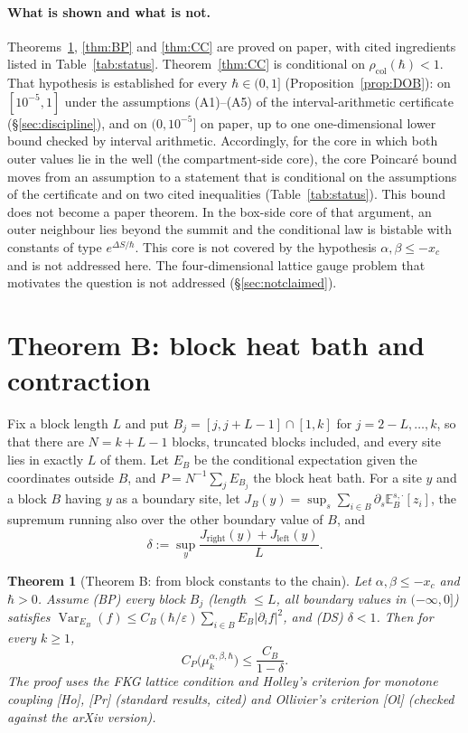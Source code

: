 \documentclass[11pt,a4paper]{article}
\newtheorem{theorem}{Theorem}[section]
\theoremstyle{definition}
\theoremstyle{remark}
\newcommand{\E}{\mathbb{E}}
\newcommand{\Var}{\operatorname{Var}}
\newcommand{\xc}{x_c}
\newcommand{\rcol}{\rho_{\mathrm{col}}}
\begin{document}
\paragraph{What is shown and what is not.} Theorems~\ref{thm:B}, \ref{thm:BP} and \ref{thm:CC} are proved on paper, with cited ingredients listed in Table~\ref{tab:status}. Theorem~\ref{thm:CC} is conditional on $\rcol(\hbar)<1$. That hypothesis is established for every $\hbar\in(0,1]$ (Proposition~\ref{prop:DOB}): on $[10^{-5},1]$ under the assumptions (A1)--(A5) of the interval-arithmetic certificate (\S\ref{sec:discipline}), and on $(0,10^{-5}]$ on paper, up to one one-dimensional lower bound checked by interval arithmetic. Accordingly, for the core in which both outer values lie in the well (the compartment-side core), the core Poincar\'e bound moves from an assumption to a statement that is conditional on the assumptions of the certificate and on two cited inequalities (Table~\ref{tab:status}). This bound does not become a paper theorem. In the box-side core of that argument, an outer neighbour lies beyond the summit and the conditional law is bistable with constants of type $e^{\Delta S/\hbar}$. This core is not covered by the hypothesis $\alpha,\beta\le-\xc$ and is not addressed here. The four-dimensional lattice gauge problem that motivates the question is not addressed (\S\ref{sec:notclaimed}).

\section{Theorem B: block heat bath and contraction}\label{sec:B}

Fix a block length $L$ and put $B_j=[j,j+L-1]\cap[1,k]$ for $j=2-L,\dots,k$, so that there are $N=k+L-1$ blocks, truncated blocks included, and every site lies in exactly $L$ of them. Let $E_B$ be the conditional expectation given the coordinates outside $B$, and $P=N^{-1}\sum_jE_{B_j}$ the block heat bath. For a site $y$ and a block $B$ having $y$ as a boundary site, let $J_B(y)=\sup_s\sum_{i\in B}\partial_s\E_B^{s,\cdot}[z_i]$, the supremum running also over the other boundary value of $B$, and
\[
\delta:=\sup_y\frac{J_{\mathrm{right}}(y)+J_{\mathrm{left}}(y)}{L}.
\]

\begin{theorem}[Theorem B: from block constants to the chain]\label{thm:B}
Let $\alpha,\beta\le-\xc$ and $\hbar>0$. Assume
\textup{(BP)} every block $B_j$ \textup{(}length $\le L$, all boundary values in $(-\infty,0]$\textup{)} satisfies $\Var_{E_B}(f)\le C_B(\hbar/\varepsilon)\sum_{i\in B}E_B|\partial_if|^2$, and
\textup{(DS)} $\delta<1$.
Then for every $k\ge1$,
\[
C_P\big(\mu_k^{\alpha,\beta,\hbar}\big)\le\frac{C_B}{1-\delta}.
\]
The proof uses the FKG lattice condition and Holley's criterion for monotone coupling [Ho], [Pr] \textup{(}standard results, cited\textup{)} and Ollivier's criterion [Ol] \textup{(}checked against the arXiv version\textup{)}.
\end{theorem}
\end{document}
